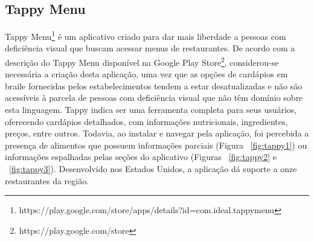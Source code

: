 \subsection{\label{subsec:tappy}Tappy Menu}
Tappy Menu\footnote{https://play.google.com/store/apps/details?id=com.ideal.tappymenu} é um aplicativo criado para dar mais liberdade a pessoas com deficiência visual que buscam acessar menus de restaurantes. De acordo com a descrição do Tappy Menu disponível na Google Play Store\footnote{https://play.google.com/store}, considerou-se necessária a criação desta aplicação, uma vez que as opções de cardápios em braile fornecidas pelos estabelecimentos tendem a estar desatualizadas e não são acessíveis à parcela de pessoas com deficiência visual que não têm domínio sobre esta linguagem. Tappy indica ser uma ferramenta completa para seus usuários, oferecendo cardápios detalhados, com informações nutricionais, ingredientes, preços, entre outros. Todavia, ao instalar e navegar pela aplicação, foi percebida a presença de alimentos que possuem informações parciais (Figura ~\ref{fig:tappy1}) ou informações espalhadas pelas seções do aplicativo (Figuras ~\ref{fig:tappy2} e ~\ref{fig:tappy3}). Desenvolvido nos Estados Unidos, a aplicação dá suporte a onze restaurantes da região.

